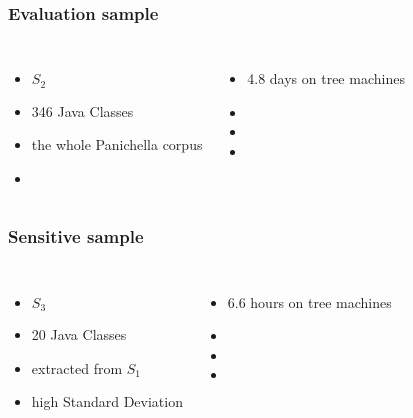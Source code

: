 \begin{frame}
	\frametitle{Evaluation sample}
	
	\begin{columns}[c]
		
		\blockheading{}
		\begin{itemize}
			\item $S_2$
			\item 346 Java Classes
			\item the whole Panichella corpus
			\item 
		\end{itemize}
		
		\blockheading{}
		\begin{itemize}
			\item 4.8 days on tree machines
			\item 
			\item 
			\item 
		\end{itemize}

	\end{columns}
	
\end{frame}

\begin{frame}
	\frametitle{Sensitive sample}
	
	\begin{columns}[c]
		
		\column{.45\textwidth}
		\blockheading{}
		\begin{itemize}
			\item $S_3$
			\item 20 Java Classes
			\item extracted from $S_1$
			\item high Standard Deviation
		\end{itemize}
		
		\column{.45\textwidth}
		\blockheading{}
		\begin{itemize}
			\item 6.6 hours on tree machines
			\item 
			\item 
			\item 
		\end{itemize}

	\end{columns}
	
\end{frame}

